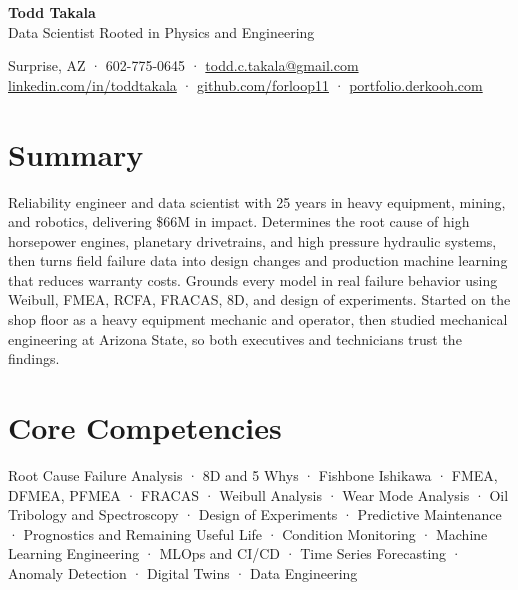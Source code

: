 \documentclass[10pt]{article}
\begin{document}
\begin{center}
  {\color{navy}\Huge\bfseries Todd Takala}\\[3pt]
  {\color{slate} Data Scientist Rooted in Physics and Engineering\\[4pt]}
   
  
  {\small Surprise, AZ · 602-775-0645 · \href{mailto:todd.c.takala@gmail.com}{todd.c.takala@gmail.com}}\\[2pt]
  {\small \href{https://www.linkedin.com/in/toddtakala}{linkedin.com/in/toddtakala} ·
          \href{https://www.github.com/forloop11}{github.com/forloop11} ·
          \href{https://portfolio.derkooh.com/}{portfolio.derkooh.com}}
\end{center}

\section{Summary}
Reliability engineer and data scientist with 25 years in heavy equipment, mining, and robotics, delivering \$66M in impact. Determines the root cause of high horsepower engines, planetary drivetrains, and high pressure hydraulic systems, then turns field failure data into design changes and production machine learning that reduces warranty costs. Grounds every model in real failure behavior using Weibull, FMEA, RCFA, FRACAS, 8D, and design of experiments. Started on the shop floor as a heavy equipment mechanic and operator, then studied mechanical engineering at Arizona State, so both executives and technicians trust the findings.

\section{Core Competencies}
Root Cause Failure Analysis · 8D and 5 Whys · Fishbone Ishikawa · FMEA, DFMEA, PFMEA · FRACAS · Weibull Analysis · Wear Mode Analysis · Oil Tribology and Spectroscopy · Design of Experiments · Predictive Maintenance · Prognostics and Remaining Useful Life · Condition Monitoring · Machine Learning Engineering · MLOps and CI/CD · Time Series Forecasting · Anomaly Detection · Digital Twins · Data Engineering

\end{document}
